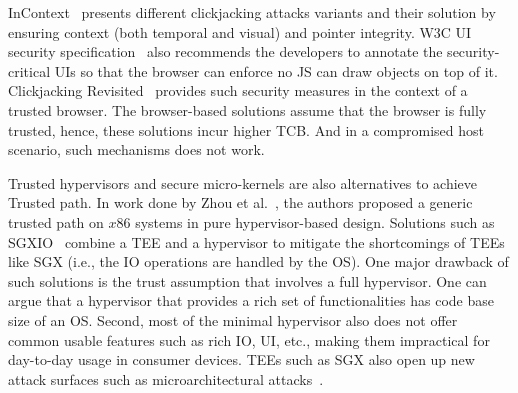 
 InContext~\cite{huang2012clickjacking} presents different clickjacking attacks variants and their solution by ensuring context (both temporal and visual) and pointer integrity. W3C UI security specification~\cite{w3c_spec} also recommends the developers to annotate the security-critical UIs so that the browser can enforce no JS can draw objects on top of it. Clickjacking Revisited~\cite{akhawe2014clickjacking} provides such security measures in the context of a trusted browser. The browser-based solutions assume that the browser is fully trusted, hence, these solutions incur higher TCB. And in a compromised host scenario, such mechanisms does not work.


 Trusted hypervisors and secure micro-kernels are also alternatives to achieve Trusted path. In work done by Zhou et al.~\cite{zhou2012building}, the authors proposed a generic trusted path on $x86$ systems in pure hypervisor-based design. Solutions such as SGXIO~\cite{weiser2017sgxio}  combine a TEE and a hypervisor to mitigate the shortcomings of TEEs like SGX (i.e., the IO operations are handled by the OS). One major drawback of such solutions is the trust assumption that involves a full hypervisor. One can argue that a hypervisor that provides a rich set of functionalities has code base size of an OS. Second, most of the minimal hypervisor also does not offer common usable features such as rich IO, UI, etc., making them impractical for day-to-day usage in consumer devices. TEEs such as SGX also open up new attack surfaces such as microarchitectural attacks~\cite{van2018foreshadow}.

